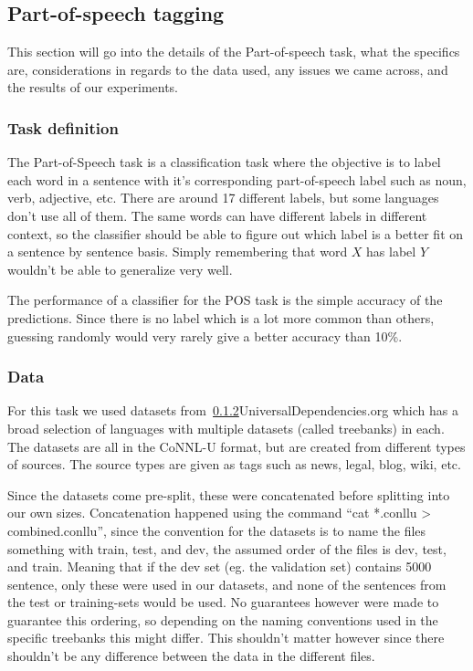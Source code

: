 
\subsection{Part-of-speech tagging}

This section will go into the details of the Part-of-speech task, what the
specifics are, considerations in regards to the data used, any issues we came
across, and the results of our experiments.

\subsubsection{Task definition}

The Part-of-Speech task is a classification task where the objective is to label
each word in a sentence with it's corresponding part-of-speech label such as
noun, verb, adjective, etc. There are around 17 different labels, but some
languages don't use all of them. The same words can have different labels in
different context, so the classifier should be able to figure out which label is
a better fit on a sentence by sentence basis. Simply remembering that word $X$
has label $Y$ wouldn't be able to generalize very well.

The performance of a classifier for the POS task is the simple accuracy of the
predictions. Since there is no label which is a lot more common than others,
guessing randomly would very rarely give a better accuracy than 10\%.

\subsubsection{Data}

For this task we used datasets from~\ref{}{UniversalDependencies.org} which has
a broad selection of languages with multiple datasets (called treebanks) in
each. The datasets are all in the CoNNL-U format, but are created from different
types of sources. The source types are given as tags such as news, legal, blog,
wiki, etc.

Since the datasets come pre-split, these were concatenated before splitting into
our own sizes. Concatenation happened using the command ``cat *.conllu >
combined.conllu'', since the convention for the datasets is to name the files
something with train, test, and dev, the assumed order of the files is dev,
test, and train. Meaning that if the dev set (eg. the validation set) contains
5000 sentence, only these were used in our datasets, and none of the sentences
from the test or training-sets would be used. No guarantees however were made to
guarantee this ordering, so depending on the naming conventions used in the
specific treebanks this might differ. This shouldn't matter however since there
shouldn't be any difference between the data in the different files.

